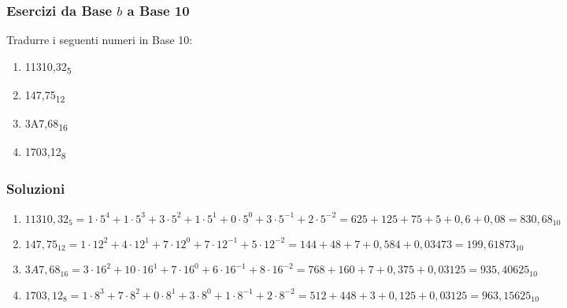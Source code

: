 \documentclass{article}
\begin{document}

\subsubsection{Esercizi da Base $b$ a Base 10}
Tradurre i seguenti numeri in Base 10:
\begin{enumerate}
\item 11310,32\textsubscript{5}
\item 147,75\textsubscript{12}
\item 3A7,68\textsubscript{16}
\item 1703,12\textsubscript{8}
\end{enumerate}

\subsubsection{Soluzioni}
\begin{enumerate}
\item $11310,32_{5}=1\cdot 5^{4}+1\cdot 5^{3}+3\cdot 5^{2}+1\cdot 5^{1}+0\cdot 5^{0}+3\cdot 5^{-1}+2\cdot 5^{-2}=625+125+75+5+0,6+0,08=830,68_{10}$

\item $147,75_{12}=1\cdot 12^{2}+4\cdot 12^{1}+7\cdot 12^{0}+7\cdot 12^{-1}+5\cdot 12^{-2}=144+48+7+0,584+0,03473=199,61873_{10}$

\item $3A7,68_{16}=3\cdot 16^{2}+10\cdot 16^{1}+7\cdot 16^{0}+6\cdot 16^{-1}+8\cdot 16^{-2}=768+160+7+0,375+0,03125=935,40625_{10}$

\item $1703,12_{8}=1\cdot 8^{3}+7\cdot 8^{2}+0\cdot 8^{1}+3\cdot 8^{0}+1\cdot 8^{-1}+2\cdot 8^{-2}=512+448+3+0,125+0,03125=963,15625_{10}$
\end{enumerate}
\end{document}
